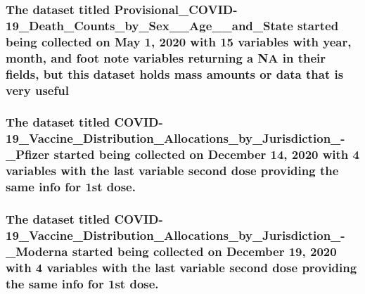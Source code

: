\documentclass[
]{article}
\begin{document}
\hypertarget{the-dataset-titled-provisional_covid-19_death_counts_by_sex__age__and_state-started-being-collected-on-may-1-2020-with-15-variables-with-year-month-and-foot-note-variables-returning-a-na-in-their-fields-but-this-dataset-holds-mass-amounts-or-data-that-is-very-useful}{%
\subsubsection{The dataset titled
Provisional\_COVID-19\_Death\_Counts\_by\_Sex\_\_Age\_\_and\_State
started being collected on May 1, 2020 with 15 variables with year,
month, and foot note variables returning a NA in their fields, but this
dataset holds mass amounts or data that is very
useful}\label{the-dataset-titled-provisional_covid-19_death_counts_by_sex__age__and_state-started-being-collected-on-may-1-2020-with-15-variables-with-year-month-and-foot-note-variables-returning-a-na-in-their-fields-but-this-dataset-holds-mass-amounts-or-data-that-is-very-useful}}

\hypertarget{the-dataset-titled-covid-19_vaccine_distribution_allocations_by_jurisdiction_-_pfizer-started-being-collected-on-december-14-2020-with-4-variables-with-the-last-variable-second-dose-providing-the-same-info-for-1st-dose.}{%
\subsubsection{The dataset titled
COVID-19\_Vaccine\_Distribution\_Allocations\_by\_Jurisdiction\_-\_Pfizer
started being collected on December 14, 2020 with 4 variables with the
last variable second dose providing the same info for 1st
dose.}\label{the-dataset-titled-covid-19_vaccine_distribution_allocations_by_jurisdiction_-_pfizer-started-being-collected-on-december-14-2020-with-4-variables-with-the-last-variable-second-dose-providing-the-same-info-for-1st-dose.}}

\hypertarget{the-dataset-titled-covid-19_vaccine_distribution_allocations_by_jurisdiction_-_moderna-started-being-collected-on-december-19-2020-with-4-variables-with-the-last-variable-second-dose-providing-the-same-info-for-1st-dose.}{%
\subsubsection{The dataset titled
COVID-19\_Vaccine\_Distribution\_Allocations\_by\_Jurisdiction\_-\_Moderna
started being collected on December 19, 2020 with 4 variables with the
last variable second dose providing the same info for 1st
dose.}\label{the-dataset-titled-covid-19_vaccine_distribution_allocations_by_jurisdiction_-_moderna-started-being-collected-on-december-19-2020-with-4-variables-with-the-last-variable-second-dose-providing-the-same-info-for-1st-dose.}}
\end{document}
